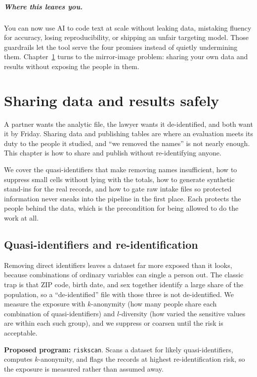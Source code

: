 \documentclass[
    a4paper,
    fontsize=10pt,
    twoside=true,
    numbers=noenddot,
]{kaobook}
\begin{document}
\paragraph{Where this leaves you.} You can now use AI to code text at scale without leaking data, mistaking fluency for accuracy, losing reproducibility, or shipping an unfair targeting model. Those guardrails let the tool serve the four promises instead of quietly undermining them. Chapter~\ref{ch:sharing} turns to the mirror-image problem: sharing your own data and results without exposing the people in them.

\chapter{Sharing data and results safely}\label{ch:sharing}

A partner wants the analytic file, the lawyer wants it de-identified, and both want it by Friday. Sharing data and publishing tables are where an evaluation meets its duty to the people it studied, and \enquote{we removed the names} is not nearly enough. This chapter is how to share and publish without re-identifying anyone.

We cover the quasi-identifiers that make removing names insufficient, how to suppress small cells without lying with the totals, how to generate synthetic stand-ins for the real records, and how to gate raw intake files so protected information never sneaks into the pipeline in the first place. Each protects the people behind the data, which is the precondition for being allowed to do the work at all.

\section{Quasi-identifiers and re-identification}
Removing direct identifiers leaves a dataset far more exposed than it looks, because combinations of ordinary variables can single a person out. The classic trap is that ZIP code, birth date, and sex together identify a large share of the population, so a \enquote{de-identified} file with those three is not de-identified. We measure the exposure with $k$-anonymity (how many people share each combination of quasi-identifiers) and $l$-diversity (how varied the sensitive values are within each such group), and we suppress or coarsen until the risk is acceptable.

\begin{kaobox}[frametitle=Ado-file Idea: \texttt{riskscan}]
\textbf{Proposed program:} \texttt{riskscan}. Scans a dataset for likely quasi-identifiers, computes $k$-anonymity, and flags the records at highest re-identification risk, so the exposure is measured rather than assumed away.
\end{kaobox}
\end{document}
